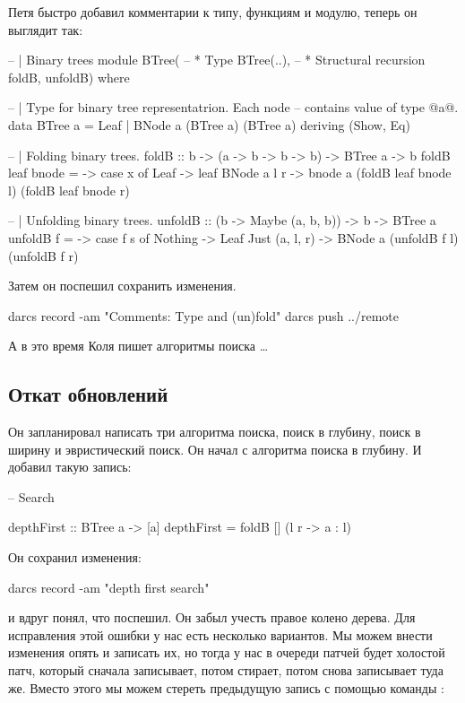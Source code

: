 Петя быстро добавил комментарии к типу, функциям и модулю,
теперь он выглядит так:

\begin{code}
-- | Binary trees
module BTree(
    -- * Type
    BTree(..),
    -- * Structural recursion
    foldB, unfoldB) 
where

-- | Type for binary tree representatrion. Each node
-- contains value of type @a@. 
data BTree a = Leaf | BNode a (BTree a) (BTree a)
    deriving (Show, Eq)

-- | Folding binary trees.
foldB :: b -> (a -> b -> b -> b) -> BTree a -> b
foldB leaf bnode = \x -> case x of
    Leaf        -> leaf
    BNode a l r -> bnode a (foldB leaf bnode l) (foldB leaf bnode r)

-- | Unfolding binary trees.
unfoldB :: (b -> Maybe (a, b, b)) -> b -> BTree a
unfoldB f = \s -> case f s of
    Nothing         -> Leaf
    Just (a, l, r)  -> BNode a (unfoldB f l) (unfoldB f r)
\end{code}

Затем он поспешил сохранить изменения.

\begin{code}
darcs record -am "Comments: Type and (un)fold"
darcs push ../remote
\end{code}

А в это время Коля пишет алгоритмы поиска \dots

\subsection{Откат обновлений}


Он запланировал написать три алгоритма поиска, 
поиск в глубину, поиск в ширину и эвристический
поиск. Он начал с алгоритма поиска в глубину. 
И добавил такую запись:

\begin{code}
-- Search 

depthFirst :: BTree a -> [a]
depthFirst = foldB [] (\a l r -> a : l)
\end{code}

Он сохранил изменения:

\begin{code}
darcs record -am "depth first search"
\end{code}

\noindent и вдруг понял, что поспешил. Он забыл 
учесть правое колено дерева. Для исправления этой
ошибки у нас есть несколько вариантов. Мы можем
внести изменения опять и записать их, но 
тогда у нас в очереди патчей будет холостой патч,
который  сначала записывает, потом стирает, потом
снова записывает туда же. Вместо этого мы можем
стереть предыдущую запись с помощью команды
:

